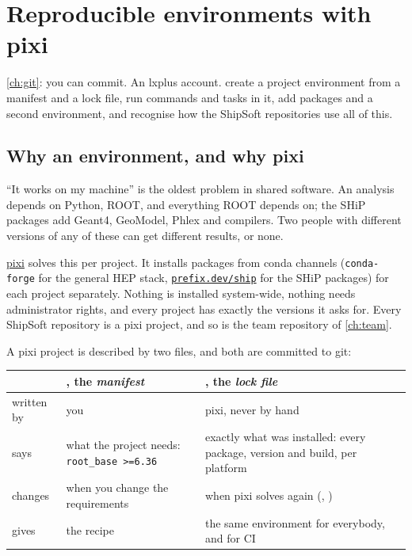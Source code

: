 \chapter{Reproducible environments with pixi}
\label{ch:pixi}

{\cref{ch:git}: you can commit. An lxplus account.}
{create a project environment from a manifest and a lock file, run commands
and tasks in it, add packages and a second environment, and recognise how the
ShipSoft repositories use all of this.}

\section{Why an environment, and why pixi}

``It works on my machine'' is the oldest problem in shared software. An
analysis depends on Python, ROOT, and everything ROOT depends on; the SHiP
packages add Geant4, GeoModel, Phlex and compilers. Two people with different
versions of any of these can get different results, or none.

\href{https://pixi.sh}{pixi} solves this per project. It installs packages
from conda channels (\texttt{conda-forge} for the general HEP stack,
\href{https://prefix.dev/channels/ship}{\texttt{prefix.dev/ship}} for the SHiP
packages) for each project separately. Nothing is installed system-wide,
nothing needs administrator rights, and every project has exactly the
versions it asks for. Every ShipSoft repository is a pixi
project, and so is the team repository of \cref{ch:team}.

A pixi project is described by two files, and both are committed to git:

\begin{center}\small
\begin{tabularx}{\linewidth}{l L L}
\toprule
 & , the \emph{manifest} & , the \emph{lock file} \\
\midrule
written by & you & pixi, never by hand \\
says       & what the project needs: \texttt{root\_base >=6.36} & exactly what was installed:
                                                             every package, version and build, per platform \\
changes    & when you change the requirements & when pixi solves again (, ) \\
gives      & the recipe & the same environment for everybody, and for CI \\
\bottomrule
\end{tabularx}
\end{center}


